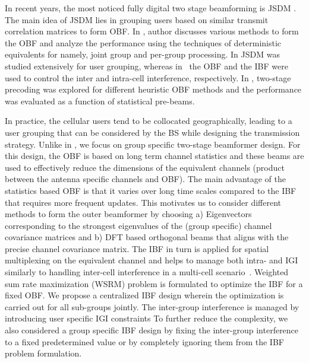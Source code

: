 \documentclass[letterpaper,conference,10pt]{IEEEtran}
\begin{document}
		In recent years, the most noticed fully digital two stage beamforming is \ac{JSDM} \cite{adhikary2013joint}. The main idea of \ac{JSDM} lies in grouping users based on similar transmit correlation matrices to form \ac{OBF}. In \cite{adhikary2013joint}, author discusses various methods to form the \ac{OBF} and analyze the performance using the techniques of deterministic equivalents for namely, joint group and per-group processing. In \cite{nam2014joint, nam2015user, xu2014user} \ac{JSDM} was studied extensively for user grouping, %
		whereas in~\cite{liu2014hierarchical} the \ac{OBF} and the \ac{IBF} were used to control the inter and intra-cell interference, respectively. In \cite{arvola2016two}, two-stage precoding was explored for different heuristic \ac{OBF} methods and the performance was evaluated as a function of statistical pre-beams. 
		
		In practice, the cellular users tend to be collocated geographically, leading to a user grouping that can be considered by the \ac{BS} while designing the transmission strategy. Unlike in \cite{arvola2016two}, we focus on group specific two-stage beamformer design. For this design, the \ac{OBF} is based on long term channel statistics and these beams are used to effectively reduce the dimensions of the equivalent channels (product between the antenna specific channels and OBF). The main advantage of the statistics based \ac{OBF} is that it varies over long time scales compared to the \ac{IBF} that requires more frequent updates. This motivates us to consider different methods to form the outer beamformer by choosing a) Eigenvectors corresponding to the strongest eigenvalues of the (group specific) channel covariance matrices and b) \ac{DFT} based orthogonal beams that aligns with the precise channel covariance matrix. The \ac{IBF} in turn is applied for spatial multiplexing on the equivalent channel and helps to manage both intra- and \ac{IGI} similarly to handling inter-cell interference in a multi-cell scenario~\cite{venkatraman2016traffic}. Weighted sum rate maximization (\acs{WSRM}) problem is formulated to optimize the \ac{IBF} for a fixed \ac{OBF}. We propose a centralized \ac{IBF} design wherein the optimization is carried out for all sub-groups jointly. The inter-group interference is managed by introducing  user specific \ac{IGI} constraints To further reduce the complexity, we also considered a group specific \ac{IBF} design by fixing the inter-group interference to a fixed predetermined value or by completely ignoring them from the \ac{IBF} problem formulation.	
		
\end{document}
